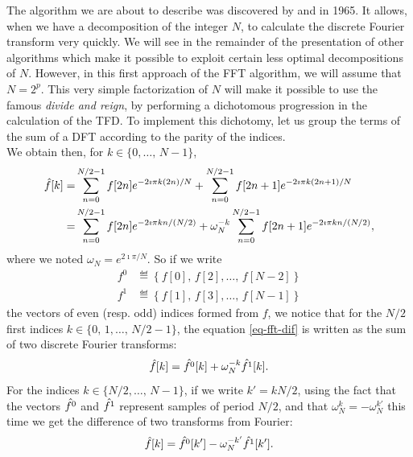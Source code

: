    The algorithm we are about to describe was discovered by  and  in 1965. It allows, when we have a  decomposition of the integer $N$, to calculate the discrete Fourier transform very quickly. We will see in the remainder of the presentation of other algorithms which make it possible to exploit certain less optimal decompositions of $N$. However, in this first approach of the FFT algorithm, we will assume that $ N = 2^p $. This very simple factorization of $N$ will make it possible to use the famous  \textit{divide and reign}, by performing a dichotomous progression in the calculation of the TFD. To implement this dichotomy, let us group the terms of the sum of a DFT according to the parity of the indices. \\We obtain then, for $ k \in \{0, \ldots, \, N-1\} $,
\begin{align}
\hat{f}[k] = & \sum_{n = 0}^{N / 2-1}{f[2 n] e^{- 2 \imath \pi k (2 n) / N}} + \sum_{n = 0}^{N / 2-1}{f[2 n + 1] e^{- 2 \imath \pi k (2n + 1) / N}} \\
\label{eq-fft-dif}
= & \sum_{n = 0}^{N / 2-1}{f[2 n] e^{- 2 \imath \pi kn / (N / 2)}} + \omega_N^{- k} \sum_{n = 0}^{N / 2-1}{f[2 n + 1] e^{- 2 \imath \pi kn / (N / 2)}},
\end{align}
where we noted $ \omega_N = e^{2 \imath \pi / N} $. So if we write \label{notation-44}
\begin{align}
\label{eq-part-even-odd}
f^0 & \eqdef \left\{f[0], \, f[2], \ldots, \, f[N-2] \right\} \\
f^1 & \eqdef \left\{f[1], \, f[3], \ldots, \, f[N-1] \right\}
\end{align}
the vectors of even (resp. odd) indices formed from $ f $, we notice that for the $ N / 2 $ first indices $ k \in \{0, \, 1, \ldots, \, N / 2-1\} $, the equation \eqref{eq-fft-dif} is written as the sum of two discrete Fourier transforms:
\begin{equation}
\label{eq-danielson-lanczos-1}
\hat{f}[k] = \hat{f^0}[k] + \omega_N^{- k} \hat{f^1}[k].
\end{equation}
For the indices $ k \in \{N / 2, \ldots, \, N-1\} $, if we write $ k'= kN / 2 $, using the fact that the vectors $ \hat{f^0} $ and $ \hat{f^1} $ represent samples of period $ N / 2 $, and that $ \omega_N^k = - \omega_N^{k'} $ this time we get the difference of two transforms from Fourier:
\begin{equation}
\label{eq-danielson-lanczos-2}
\hat{f}[k] = \hat{f^0}[k'] - \omega_N^{- k'} \hat{f^1}[k'].
\end{equation}
 
